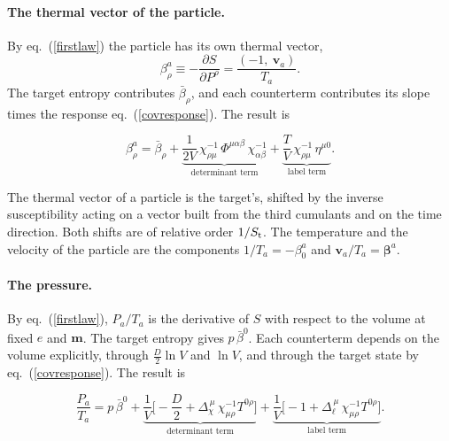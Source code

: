 \documentclass[11pt,aps,preprint,nofootinbib,superscriptaddress,tightenlines]{revtex4-2}
\def\st{\begin{equation}}
\def\stp{\end{equation}}
\def\Eq#1{eq.~(\ref{#1})}
\let\oldparagraph\paragraph
\renewcommand{\paragraph}{\par\bigskip\oldparagraph}
\begin{document}
\paragraph{The thermal vector of the particle.}  By \Eq{firstlaw} the particle has its own thermal vector,
\st
\beta^a_\rho\equiv-\frac{\partial S}{\partial P^\rho}=\frac{(-1,\ \bm v_a)}{T_a} .
\stp
The target entropy contributes $\bar\beta_\rho$, and each counterterm contributes its slope times the response \Eq{covresponse}.  The result is
\begin{keyeq}
\st
\beta^a_\rho=\bar\beta_\rho
+\underbrace{\frac1{2V}\,\chi^{-1}_{\rho\mu}\,\Phi^{\mu\alpha\beta}\,\chi^{-1}_{\alpha\beta}}_{\text{determinant term}}
+\underbrace{\frac TV\,\chi^{-1}_{\rho\mu}\,\eta^{\mu0}}_{\text{label term}} .
\label{betaa}
\stp
\end{keyeq}
The thermal vector of a particle is the target's, shifted by the inverse susceptibility acting on a vector built from the third cumulants and on the
time direction.  Both shifts are of relative order $1/S_{\rm t}$.  The temperature and the velocity of the particle are the components
$1/T_a=-\beta^a_0$ and $\bm v_a/T_a=\bm\beta^a$.

\paragraph{The pressure.}  By \Eq{firstlaw}, $P_a/T_a$ is the derivative of $S$ with respect to the volume at fixed $e$ and $\bm m$.  The target
entropy gives $p\,\bar\beta^0$.  Each counterterm depends on the volume explicitly, through $\tfrac D2\ln V$ and $\ln V$, and through the target state by
\Eq{covresponse}.  The result is
\begin{keyeq}
\st
\frac{P_a}{T_a}=p\,\bar\beta^0
+\underbrace{\frac1V\Big[-\frac D2+\Delta_\chi^{\,\mu}\,\chi^{-1}_{\mu\rho}T^{0\rho}\Big]}_{\text{determinant term}}
+\underbrace{\frac1V\Big[-1+\Delta_\ell^{\,\mu}\,\chi^{-1}_{\mu\rho}T^{0\rho}\Big]}_{\text{label term}} .
\label{covPa}
\stp
\end{keyeq}
\end{document}
